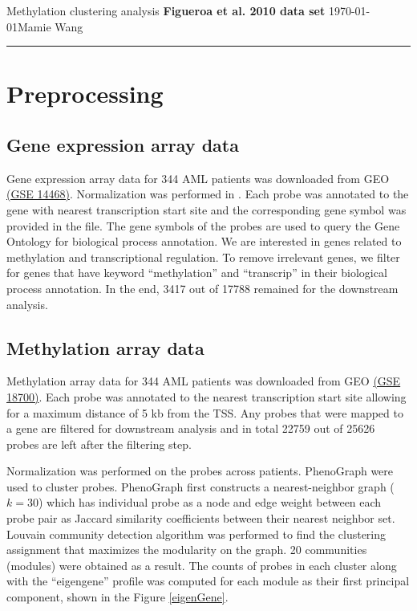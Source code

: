 \documentclass{article}
\begin{document}
\noindent
Methylation clustering analysis \hfill \textbf{Figueroa et al. 2010 data set} \newline 
\today \hfill Mamie Wang

\noindent
\rule{\linewidth}{0.4pt}

\listoffigures

\clearpage

\section{Preprocessing}

\subsection{Gene expression array data}

Gene expression array data for 344 AML patients was downloaded from GEO \href{https://www.ncbi.nlm.nih.gov/geo/query/acc.cgi?acc=GSE14468}{(GSE 14468)}. Normalization was performed in \cite{gentles2015prognostic}. Each probe was annotated to the gene with nearest transcription start site and the corresponding gene symbol was provided in the file. The gene symbols of the probes are used to query the Gene Ontology \cite{ashburner2000gene} for biological process annotation. We are interested in genes related to methylation and transcriptional regulation. To remove irrelevant genes, we filter for genes that have keyword ``methylation'' and ``transcrip'' in their biological process annotation. In the end, 3417 out of 17788 remained for the downstream analysis. 

\subsection{Methylation array data}

Methylation array data for 344 AML patients was downloaded from GEO \href{https://www.ncbi.nlm.nih.gov/geo/query/acc.cgi?acc=GSE18700}{(GSE 18700)}. Each probe was annotated to the nearest transcription start site allowing for a maximum distance of 5 kb from the TSS. Any probes that were mapped to a gene are filtered for downstream analysis and in total 22759 out of 25626 probes are left after the filtering step. 

Normalization was performed on the probes across patients. %
PhenoGraph  \cite{levine2015data} were used to cluster probes. PhenoGraph first constructs a nearest-neighbor graph ($k = 30$) which has individual probe as a node and edge weight between each probe pair as Jaccard similarity coefficients between their nearest neighbor set. Louvain community detection algorithm was performed to find the clustering assignment that maximizes the modularity on the graph. 20 communities (modules) were obtained as a result. The counts of probes in each cluster along with the ``eigengene'' profile was computed for each module as their first principal component, shown in the Figure \ref{eigenGene}. 
\end{document}

